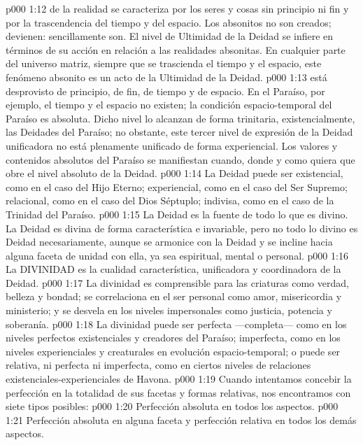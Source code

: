 \vs p000 1:12 \pc {} de la realidad se caracteriza por los seres y cosas sin principio ni fin y por la trascendencia del tiempo y del espacio. Los absonitos no son creados; devienen: sencillamente son. El nivel de Ultimidad de la Deidad se infiere en términos de su acción en relación a las realidades absonitas. En cualquier parte del universo matriz, siempre que se trascienda el tiempo y el espacio, este fenómeno absonito es un acto de la Ultimidad de la Deidad.
\vs p000 1:13 \pc {} está desprovisto de principio, de fin, de tiempo y de espacio. En el Paraíso, por ejemplo, el tiempo y el espacio no existen; la condición espacio\hyp{}temporal del Paraíso es absoluta. Dicho nivel lo alcanzan de forma trinitaria, existencialmente, las Deidades del Paraíso; no obstante, este tercer nivel de expresión de la Deidad unificadora no está plenamente unificado de forma experiencial. Los valores y contenidos absolutos del Paraíso se manifiestan cuando, donde y como quiera que obre el nivel absoluto de la Deidad.
\vs p000 1:14 \pc La Deidad puede ser existencial, como en el caso del Hijo Eterno; experiencial, como en el caso del Ser Supremo; relacional, como en el caso del Dios Séptuplo; indivisa, como en el caso de la Trinidad del Paraíso.
\vs p000 1:15 La Deidad es la fuente de todo lo que es divino. La Deidad es divina de forma característica e invariable, pero no todo lo divino es Deidad necesariamente, aunque se armonice con la Deidad y se incline hacia alguna faceta de unidad con ella, ya sea espiritual, mental o personal.
\vs p000 1:16 \pc La DIVINIDAD es la cualidad característica, unificadora y coordinadora de la Deidad.
\vs p000 1:17 La divinidad es comprensible para las criaturas como verdad, belleza y bondad; se correlaciona en el ser personal como amor, misericordia y ministerio; y se desvela en los niveles impersonales como justicia, potencia y soberanía.
\vs p000 1:18 La divinidad puede ser perfecta ---completa--- como en los niveles perfectos existenciales y creadores del Paraíso; imperfecta, como en los niveles experienciales y creaturales en evolución espacio\hyp{}temporal; o puede ser relativa, ni perfecta ni imperfecta, como en ciertos niveles de relaciones existenciales\hyp{}experienciales de Havona.
\vs p000 1:19 \pc Cuando intentamos concebir la perfección en la totalidad de sus facetas y formas relativas, nos encontramos con siete tipos posibles:
\vs p000 1:20 Perfección absoluta en todos los aspectos.
\vs p000 1:21 Perfección absoluta en alguna faceta y perfección relativa en todos los demás aspectos.
